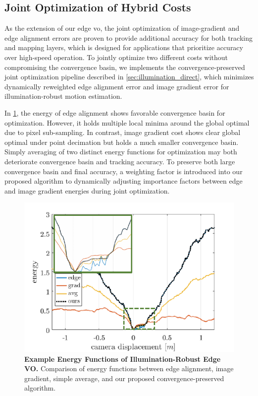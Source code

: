 \subsection{Joint Optimization of Hybrid Costs}
As the extension of our edge \acrshort{vo}, the joint optimization of image-gradient and edge alignment errors are proven to provide additional accuracy for both tracking and mapping layers, which is designed for applications that prioritize accuracy over high-speed operation.
To jointly optimize two different costs without compromising the convergence basin, we implements the convergence-preserved joint optimization pipeline described in \ref{sec:illumination_direct}, which minimizes dynamically reweighted edge alignment error and image gradient error for illumination-robust motion estimation. 


In \ref{fig:edge_energy}, the energy of edge alignment shows favorable convergence basin for optimization. However, it holds multiple local minima around the global optimal due to pixel sub-sampling. In contrast, image gradient cost shows clear global optimal under point decimation but holds a much smaller convergence basin. Simply averaging of two distinct energy functions for optimization may both deteriorate convergence basin and tracking accuracy. To preserve both large convergence basin and final accuracy, a weighting factor is introduced into our proposed algorithm to  dynamically adjusting importance factors between edge and image gradient energies during joint optimization. 

\begin{figure}[t] 
  	\centering
  	\includegraphics[width=0.6\linewidth]{figures/illumination/edge_energy.pdf}
    \caption[Example Energy Functions of Illumination-Robust Edge VO]{\textbf{Example Energy Functions of Illumination-Robust Edge VO.} Comparison of energy functions between edge alignment, image gradient, simple average, and our proposed convergence-preserved algorithm. 
	\label{fig:edge_energy}}
\end{figure}

